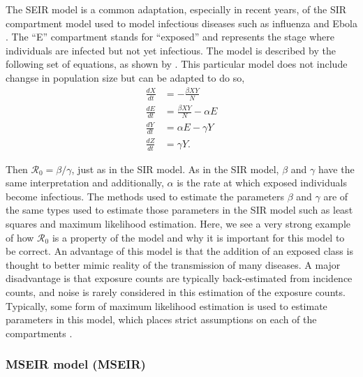 \documentclass[12pt]{article}
\newcommand{\rr}{\ensuremath{\mathcal{R}_0}}
\begin{document}
The SEIR model is a common adaptation, especially in recent years, of the SIR compartment model used to model infectious diseases such as influenza and Ebola \citep{mills2004,althaus2014}.  The ``E'' compartment stands for ``exposed'' and represents the stage where individuals are infected but not yet infectious.  The model is described by the following set of equations, as shown by \cite{cintronarias2009}.  This particular model  does not include changse in population size but can be adapted to do so,
\begin{align*}
  \frac{dX}{dt} &= - \frac{\beta XY}{N} \\
  \frac{dE}{dt} &= \frac{\beta XY}{N}  - \alpha E\\
  \frac{dY}{dt} &= \alpha E - \gamma Y \\
  \frac{dZ}{dt} &= \gamma Y.
\end{align*}

Then $\rr = \beta / \gamma$, just as in the SIR model.  As in the SIR model, $\beta$ and $\gamma$ have the same interpretation and additionally, $\alpha$ is the rate at which exposed individuals become infectious.  The methods used to estimate the parameters $\beta$ and $\gamma$ are of the same types used to estimate those parameters in the SIR model such as least squares and maximum likelihood estimation.  Here, we see a very strong example of how $\rr$ is a property of the model and why it is important for this model to be correct.  An advantage of this model is that the addition of an exposed class is thought to better mimic reality of the transmission of many diseases.  A major disadvantage is that exposure counts are typically back-estimated from incidence counts, and noise is rarely considered in this estimation of the exposure counts.   Typically, some form of maximum likelihood estimation is used to estimate parameters in this model, which places strict assumptions on each of the compartments \citep{althaus2014}.

\subsubsection{MSEIR model (MSEIR)}
\label{sec:mseir-model-mseir}
\end{document}
